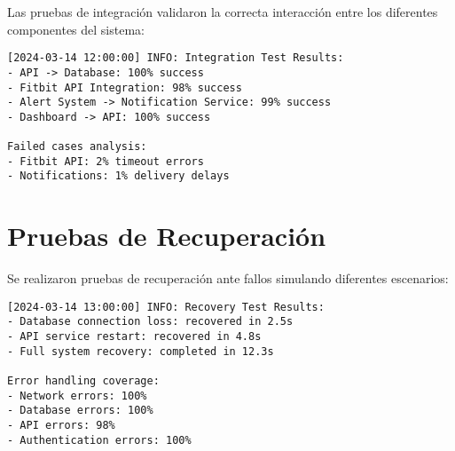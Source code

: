 Las pruebas de integración validaron la correcta interacción entre los diferentes componentes del sistema:

\begin{verbatim}
[2024-03-14 12:00:00] INFO: Integration Test Results:
- API -> Database: 100% success
- Fitbit API Integration: 98% success
- Alert System -> Notification Service: 99% success
- Dashboard -> API: 100% success

Failed cases analysis:
- Fitbit API: 2% timeout errors
- Notifications: 1% delivery delays
\end{verbatim}

\section{Pruebas de Recuperación}
\label{anexo:pruebas:recuperacion}

Se realizaron pruebas de recuperación ante fallos simulando diferentes escenarios:

\begin{verbatim}
[2024-03-14 13:00:00] INFO: Recovery Test Results:
- Database connection loss: recovered in 2.5s
- API service restart: recovered in 4.8s
- Full system recovery: completed in 12.3s

Error handling coverage:
- Network errors: 100%
- Database errors: 100%
- API errors: 98%
- Authentication errors: 100%
\end{verbatim} 